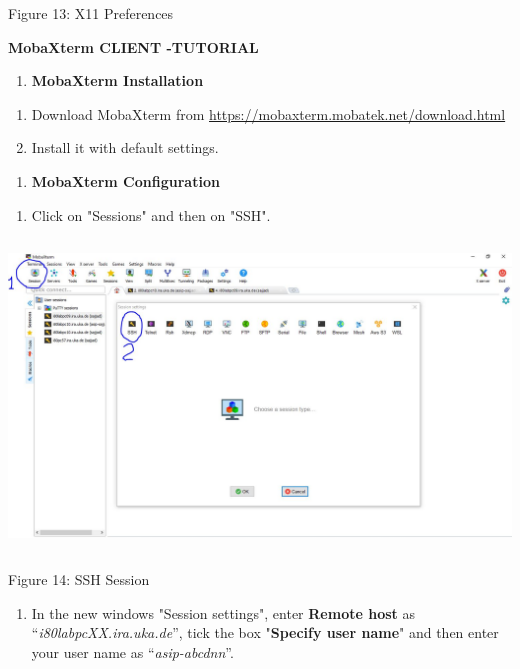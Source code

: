 \documentclass[
]{article}
\begin{document}
Figure 13: X11 Preferences

\textbf{\hfill\break
}

\textbf{MobaXterm CLIENT -TUTORIAL}

\begin{enumerate}
\def\labelenumi{\Alph{enumi}.}
\setcounter{enumi}{6}
\item
  \textbf{MobaXterm Installation}
\end{enumerate}

\begin{enumerate}
\def\labelenumi{\arabic{enumi}.}
\item
  Download MobaXterm from
  \url{https://mobaxterm.mobatek.net/download.html}
\item
  Install it with default settings.
\end{enumerate}

\begin{enumerate}
\def\labelenumi{\Alph{enumi}.}
\setcounter{enumi}{7}
\item
  \textbf{MobaXterm Configuration}
\end{enumerate}

\begin{enumerate}
\def\labelenumi{\arabic{enumi}.}
\setcounter{enumi}{2}
\item
  Click on "Sessions" and then on "SSH".
\end{enumerate}

\includegraphics[width=5.73515in,height=3.25226in]{images/media/image14.JPG}

Figure 14: SSH Session

\begin{enumerate}
\def\labelenumi{\arabic{enumi}.}
\setcounter{enumi}{3}
\item
  In the new windows "Session settings", enter \textbf{Remote host} as
  ``\emph{i80labpcXX.ira.uka.de}'', tick the box "\textbf{Specify user
  name}" and then enter your user name as ``\emph{asip-abcdnn}''.
\end{enumerate}
\end{document}
